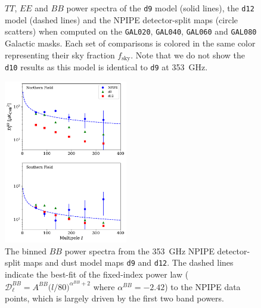 \documentclass[twocolumn]{aastex631}
\begin{document}
\begin{figure}
    \caption{$TT$, $EE$ and $BB$ power spectra of the \texttt{d9} model (solid lines), the \texttt{d12} model (dashed lines) and the NPIPE detector-split maps (circle scatters) when computed on the \texttt{GAL020}, \texttt{GAL040}, \texttt{GAL060} and \texttt{GAL080} Galactic masks. Each set of comparisons is colored in the same color representing their sky fraction $f_{\mathrm{sky}}$. Note that we do not show the \texttt{d10} results as this model is identical to \texttt{d9} at 353~GHz.}
    \label{fig:largefield_power}
\end{figure}


\begin{figure}
    \centering
    \includegraphics[width=0.48\textwidth]{figures/smallfield_power.pdf}
    \caption{The binned $BB$ power spectra from the 353~GHz NPIPE detector-split maps and dust model maps \texttt{d9} and \texttt{d12}. The dashed lines indicate the best-fit of the fixed-index power law ($\mathcal{D}_\ell^{BB} = A^{BB} \big( l/80 \big)^{\alpha^{BB}+2}$ where $\alpha^{BB} = -2.42$) to the NPIPE data points, which is largely driven by the first two band powers.}
    \label{fig:smallfield_power}
\end{figure}
\end{document}
